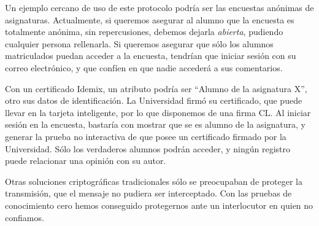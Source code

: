 \hfil

Un ejemplo cercano de uso de este protocolo podría ser las encuestas anónimas de asignaturas. Actualmente, si queremos asegurar al alumno que la encuesta es totalmente anónima, sin repercusiones, debemos dejarla \textit{abierta}, pudiendo cualquier persona rellenarla. Si queremos asegurar que sólo los alumnos matriculados puedan acceder a la encuesta, tendrían que iniciar sesión con su correo electrónico, y que confíen en que nadie accederá a sus comentarios.

Con un certificado Idemix, un atributo podría ser ``Alumno de la asignatura X'', otro sus datos de identificación. La Universidad firmó su certificado, que puede llevar en la tarjeta inteligente, por lo que disponemos de una firma CL. Al iniciar sesión en la encuesta, bastaría con mostrar que se es alumno de la asignatura, y generar la prueba no interactiva de que posee un certificado firmado por la Universidad. Sólo los verdaderos alumnos podrán acceder, y ningún registro puede relacionar una opinión con su autor.

Otras soluciones criptográficas tradicionales sólo se preocupaban de proteger la transmisión, que el mensaje no pudiera ser interceptado. Con las pruebas de conocimiento cero hemos conseguido protegernos ante un interlocutor en quien no confiamos.










